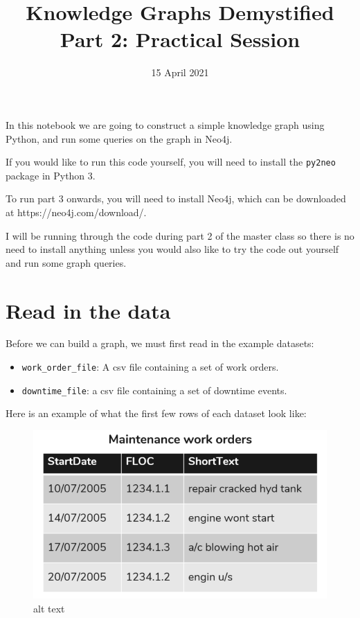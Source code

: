 \documentclass[11pt]{article}
\title{Knowledge Graphs Demystified Part 2: Practical Session}
\date{15 April 2021}
\providecommand{\tightlist}{%
      \setlength{\itemsep}{0pt}\setlength{\parskip}{0pt}}
\begin{document}
    
    \maketitle
    
    

    
    In this notebook we are going to construct a simple knowledge graph
using Python, and run some queries on the graph in Neo4j.

If you would like to run this code yourself, you will need to install
the \texttt{py2neo} package in Python 3.

To run part 3 onwards, you will need to install Neo4j, which can be
downloaded at https://neo4j.com/download/.

I will be running through the code during part 2 of the master class so
there is no need to install anything unless you would also like to try
the code out yourself and run some graph queries.

\hypertarget{read-in-the-data}{%
\section{Read in the data}\label{read-in-the-data}}

Before we can build a graph, we must first read in the example datasets:

\begin{itemize}
\tightlist
\item
  \texttt{work\_order\_file}: A csv file containing a set of work
  orders.
\item
  \texttt{downtime\_file}: a csv file containing a set of downtime
  events.
\end{itemize}

Here is an example of what the first few rows of each dataset look like:

\begin{figure}
\centering
\includegraphics{images/example-data.png}
\caption{alt text}
\end{figure}
\end{document}
